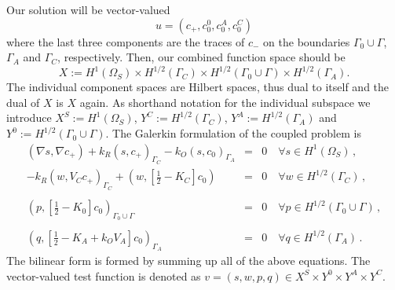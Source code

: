 \documentclass[runningheads]{lncse}
\begin{document}
Our solution will be vector-valued
 $$u = (c_+, c^0_0, c^A_0, c^C_0)$$ 
 where the last three components are the traces of $c_-$ on the boundaries $\Gamma_0 \cup \Gamma$, $\Gamma_A$ and $\Gamma_C$, respectively. 
%
%
Then, our combined function space should be 
%
$$  X :=  H^1(\Omega_S) \times H^{1/2}(\Gamma_C) \times H^{1/2}(\Gamma_0 \cup \Gamma)  \times H^{1/2}(\Gamma_A) . $$
%
The individual component spaces are Hilbert spaces, thus dual to itself and the dual of $X$ is $X$ again.
%
As shorthand notation for the individual subspace we introduce $X^S :=   H^1(\Omega_S)$,  $Y^C := H^{1/2}(\Gamma_C)$, $Y^A := H^{1/2}(\Gamma_A)$ and $Y^0 :=  H^{1/2}(\Gamma_0 \cup \Gamma)  $.
The Galerkin formulation of the coupled problem is
% 
\begin{eqnarray}
\label{eq:gal-form-prim-p}
(\nabla s, \nabla c_+)  + k_R  ( s,  c_+ )_{\Gamma_C} - k_O ( s,  c_0 )_{\Gamma_A} 
%
 & = & 0 \quad  \forall s \in H^1(\Omega_S) \,,   \\
    - k_R \left( w,   V_C c_+\right)_{\Gamma_C} +   \left( w,  \left[ \frac 1 2 - K_C\right] c_0\right)  & = & 0 \quad  \forall w \in H^{1/2}(\Gamma_C)  \,, \\
 \nonumber \\
 \left( p,  \left[ \frac 1 2 - K_0 \right] c_0 \right)_{\Gamma_0 \cup \Gamma} & = & 0  \quad  \forall p \in H^{1/2}(\Gamma_0 \cup \Gamma)  \,, \\
 \nonumber \\
  \left( q,  \left[ \frac 1 2 - K_A + k_O V_A \right] c_0 \right)_{\Gamma_A}  & = & 0 \quad  \forall q \in H^{1/2}(\Gamma_A)  \,.
\end{eqnarray}
%
The bilinear form is formed by summing up all of the above equations.
The vector-valued test function is denoted as $v = (s, w, p, q) \in X^S \times Y^0 \times Y^A \times Y^C $.
\end{document}

